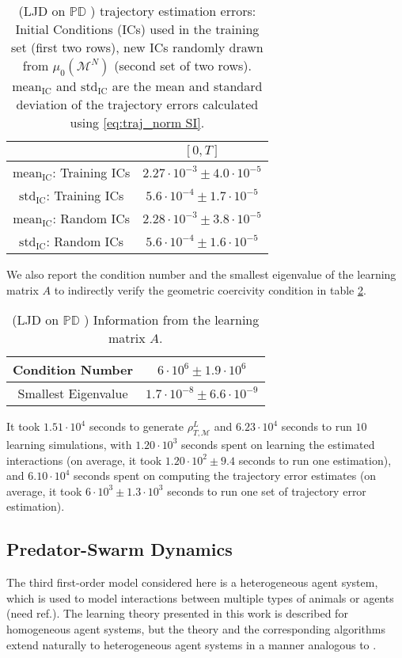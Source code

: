 \documentclass[11pt]{article}
\newcommand{\mM}{\mathcal{M}}
\newcommand{\probIC}{\mu_0}
\newcommand{\muX}{\probIC(\mM^N)}
\begin{document}
\begin{table}[H]
\centering
\small{\begin{tabular}{| c || c |} 
\hline
                                        & $[0, T]$                                \\
\hline
$\text{mean}_{\text{IC}}$: Training ICs & $2.27 \cdot 10^{-3} \pm 4.0 \cdot 10^{-5}$ \\
\hline
$\text{std}_{\text{IC}}$:  Training ICs & $5.6 \cdot 10^{-4} \pm 1.7 \cdot 10^{-5}$ \\
\hline   
\hline         
$\text{mean}_{\text{IC}}$: Random ICs   & $2.28 \cdot 10^{-3} \pm 3.8 \cdot 10^{-5}$ \\
\hline
$\text{std}_{\text{IC}}$:  Random ICs   & $5.6 \cdot 10^{-4} \pm 1.6 \cdot 10^{-5}$ \\
\hline   
\end{tabular}}
\caption{(LJD on  $ \mathbb{PD} $ ) trajectory estimation errors: Initial Conditions (ICs) used in the training set (first two rows), new ICs randomly drawn from $\muX$ (second set of two rows).  $\text{mean}_{\text{IC}}$ and $\text{std}_{\text{IC}}$ are the mean and standard deviation of the trajectory errors calculated using \eqref{eq:traj_norm SI}.}
\label{tab:LJD_on_PD_traj_err}
\end{table}
We also report the condition number and the smallest eigenvalue of the learning matrix $A$ to indirectly verify the geometric coercivity condition in table \ref{tab:LJD_on_PD_coer}.
\begin{table}[H]
\centering
\small{\begin{tabular}{ c || c } 
Condition Number    & $6 \cdot 10^{6} \pm 1.9 \cdot 10^{6}$ \\ 
\hline
Smallest Eigenvalue & $1.7 \cdot 10^{-8} \pm 6.6 \cdot 10^{-9}$
\end{tabular}}
\caption{(LJD on  $ \mathbb{PD} $ ) Information from the learning matrix $A$.}
\label{tab:LJD_on_PD_coer}
\end{table}
It took $1.51 \cdot 10^{4}$ seconds to generate $\rho_{T, \mM}^L$ and $6.23 \cdot 10^{4}$ seconds to run $10$ learning simulations, with $1.20 \cdot 10^{3}$ seconds spent on learning the estimated interactions (on average, it took $1.20 \cdot 10^{2} \pm 9.4$ seconds to run one estimation), and $6.10 \cdot 10^{4}$ seconds spent on computing the trajectory error estimates (on average, it took $6 \cdot 10^{3} \pm 1.3 \cdot 10^{3}$ seconds to run one set of trajectory error estimation).
%
\subsection{Predator-Swarm Dynamics}\label{sec:ps1_results}
%
The third first-order model considered here is a heterogeneous agent system, which is used to model interactions between multiple types of animals \cite{CK2013, Olson_2016} or agents (need ref.).  The learning theory presented in this work is described for homogeneous agent systems, but the theory and the corresponding algorithms extend naturally to heterogeneous agent systems in a manner analogous to \cite{Tang2019, miller2020learning}.  
\end{document}
